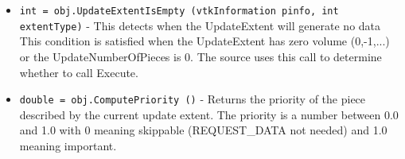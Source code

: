 \begin{itemize}
\item  \verb|int = obj.UpdateExtentIsEmpty (vtkInformation pinfo, int extentType)| -  This detects when the UpdateExtent will generate no data
 This condition is satisfied when the UpdateExtent has 
 zero volume (0,-1,...) or the UpdateNumberOfPieces is 0.
 The source uses this call to determine whether to call Execute.

\item  \verb|double = obj.ComputePriority ()| -  Returns the priority of the piece described by the current update 
 extent. The priority is a number between 0.0 and 1.0 with 0 meaning 
 skippable (REQUEST\_DATA not needed) and 1.0 meaning important. 

\end{itemize}

